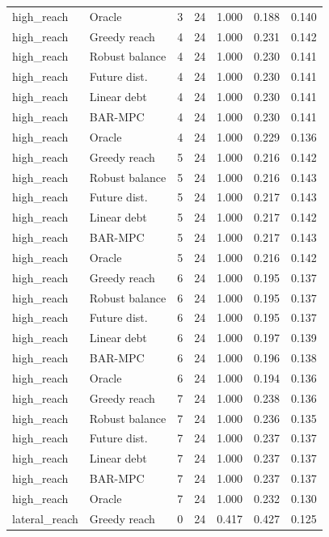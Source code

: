 \begin{longtable}{llrrrrr}
high\_reach & Oracle & 3 & 24 & 1.000 & 0.188 & 0.140 \\
high\_reach & Greedy reach & 4 & 24 & 1.000 & 0.231 & 0.142 \\
high\_reach & Robust balance & 4 & 24 & 1.000 & 0.230 & 0.141 \\
high\_reach & Future dist. & 4 & 24 & 1.000 & 0.230 & 0.141 \\
high\_reach & Linear debt & 4 & 24 & 1.000 & 0.230 & 0.141 \\
high\_reach & BAR-MPC & 4 & 24 & 1.000 & 0.230 & 0.141 \\
high\_reach & Oracle & 4 & 24 & 1.000 & 0.229 & 0.136 \\
high\_reach & Greedy reach & 5 & 24 & 1.000 & 0.216 & 0.142 \\
high\_reach & Robust balance & 5 & 24 & 1.000 & 0.216 & 0.143 \\
high\_reach & Future dist. & 5 & 24 & 1.000 & 0.217 & 0.143 \\
high\_reach & Linear debt & 5 & 24 & 1.000 & 0.217 & 0.142 \\
high\_reach & BAR-MPC & 5 & 24 & 1.000 & 0.217 & 0.143 \\
high\_reach & Oracle & 5 & 24 & 1.000 & 0.216 & 0.142 \\
high\_reach & Greedy reach & 6 & 24 & 1.000 & 0.195 & 0.137 \\
high\_reach & Robust balance & 6 & 24 & 1.000 & 0.195 & 0.137 \\
high\_reach & Future dist. & 6 & 24 & 1.000 & 0.195 & 0.137 \\
high\_reach & Linear debt & 6 & 24 & 1.000 & 0.197 & 0.139 \\
high\_reach & BAR-MPC & 6 & 24 & 1.000 & 0.196 & 0.138 \\
high\_reach & Oracle & 6 & 24 & 1.000 & 0.194 & 0.136 \\
high\_reach & Greedy reach & 7 & 24 & 1.000 & 0.238 & 0.136 \\
high\_reach & Robust balance & 7 & 24 & 1.000 & 0.236 & 0.135 \\
high\_reach & Future dist. & 7 & 24 & 1.000 & 0.237 & 0.137 \\
high\_reach & Linear debt & 7 & 24 & 1.000 & 0.237 & 0.137 \\
high\_reach & BAR-MPC & 7 & 24 & 1.000 & 0.237 & 0.137 \\
high\_reach & Oracle & 7 & 24 & 1.000 & 0.232 & 0.130 \\
lateral\_reach & Greedy reach & 0 & 24 & 0.417 & 0.427 & 0.125 \\

\end{longtable}

